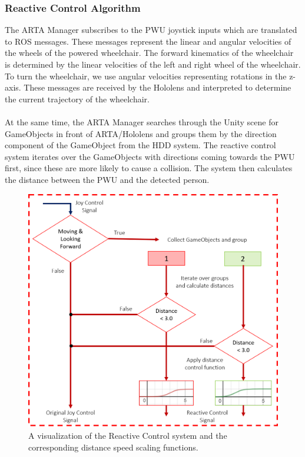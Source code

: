 \subsubsection{Reactive Control Algorithm}
The ARTA Manager subscribes to the PWU joystick inputs which are translated to ROS  messages. These messages represent the linear and angular velocities of the wheels of the powered wheelchair. The forward kinematics of the wheelchair is determined by the linear velocities of the left and right wheel of the wheelchair. To turn the wheelchair, we use angular velocities representing rotations in the z-axis. These messages are received by the Hololens and interpreted to determine the current trajectory of the wheelchair. 

\paragraph{} At the same time, the ARTA Manager searches through the Unity scene for GameObjects in front of ARTA/Hololens and groups them by the direction component of the GameObject from the HDD system. The reactive control system iterates over the GameObjects with directions coming towards the PWU first, since these are more likely to cause a collision. The system then calculates the distance between the PWU and the detected person. 

\begin{figure}[ht]
    \centering
    \includegraphics[width=0.8\linewidth]{img/chapter5_implementation/reactiveControlFlow.png}
    \caption{A visualization of the Reactive Control system and the corresponding distance speed scaling functions.}
    \label{fig:reactiveFlow}
\end{figure}

